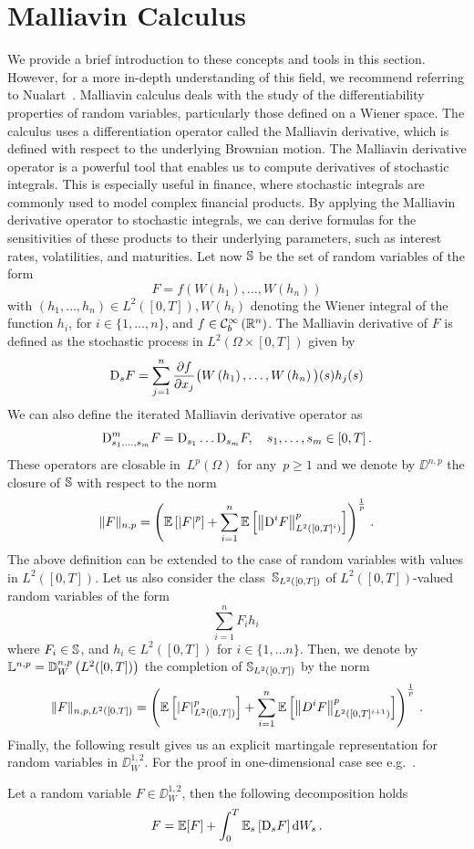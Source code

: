 \section{Malliavin Calculus}\label{apx:malliavin_calculus}

We provide a brief introduction to these concepts and tools in this section. However, for a more in-depth understanding of this field, we recommend referring to Nualart~\cite{Nualart2006TheTopics}. Malliavin calculus deals with the study of the differentiability properties of random variables, particularly those defined on a Wiener space. The calculus uses a differentiation operator called the Malliavin derivative, which is defined with respect to the underlying Brownian motion. The Malliavin derivative operator is a powerful tool that enables us to compute derivatives of stochastic integrals. This is especially useful in finance, where stochastic integrals are commonly used to model complex financial products. By applying the Malliavin derivative operator to stochastic integrals, we can derive formulas for the sensitivities of these products to their underlying parameters, such as interest rates, volatilities, and maturities. Let now $\mathbb{S}$ be the set of random variables of the form
\[
F=f\left(W\left(h_1\right), \ldots, W\left(h_n\right)\right)
\]
with $(h_1, \ldots, h_n) \in L^2([0, T]), W\left(h_i\right)$ denoting the Wiener integral of the function $h_i$, for $i\in\{1, \dots, n\}$, and $f \in \mathcal{C}_b^{\infty}\left(\mathbb{R}^n\right)$. The Malliavin derivative of $F$ is defined as the stochastic process in $L^2(\Omega \times[0, T])$ given by
\[
\mathrm{D}_s F=\sum_{j=1}^n \frac{\partial f}{\partial x_j}\big(W\left(h_1\right), \ldots, W\left(h_n\right)\big)(s) h_j(s)
\]
We can also define the iterated Malliavin derivative operator as
\[
\mathrm{D}_{s_1, \dots, s_m}^m F = \mathrm{D}_{s_1} \dots \mathrm{D}_{s_m} F, \quad s_1, \dots, s_m \in[0, T]\,.
\]
These operators are closable in~$L^p(\Omega)$ for any~$p \geq 1$ and we denote by $\DD^{n, p}$ the closure of $\mathbb{S}$ with respect to the norm
\[
\|F\|_{n, p}=\left(\mathbb{E}\left[|F|^p\right]+\sum_{i=1}^n \mathbb{E}\left[\left\|\mathrm{D}^i F\right\|_{L^2\left([0, T]^i\right)}^p\right]\right)^{\frac{1}{p}}\,.
\]
The above definition can be extended to the case of random variables with values in $L^2([0, T])$. Let us also consider the class~$\mathbb{S}_{L^2([0, T])}$ of $L^2([0, T])$-valued random variables of the form
\[
\sum_{i=1}^n F_i h_i\,
\]
where $F_i \in \mathbb{S}$, and $h_i \in L^2([0, T])$ for $i\in\{1,\dots n\}$. Then, we denote by~${\mathbb{L}^{n, p}= \mathbb{D}_W^{n, p}\left(L^2([0, T])\right)}$ the completion of $\mathbb{S}_{L^2([0, T])}$ by the norm
\[
\|F\|_{n, p, L^2([0, T])}=\left(\mathbb{E}\left[|F|_{L^2([0, T])}^p\right] + \sum_{i=1}^n \mathbb{E}\left[\left\|D^i F\right\|_{L^2\left([0, T]^{i+1}\right)}^p\right]\right)^{\frac{1}{p}}\,.
\]
Finally, the following result gives us an explicit martingale representation for random variables in $\DD_W^{1,2}$. For the proof in one-dimensional case see e.g.~\cite[Proposition 1.3.14]{Nualart2006TheTopics}.
\begin{theorem}\label{thm:ClarkOcone}
Let a random variable $F \in \DD_W^{1,2}$, then the following decomposition holds 
\[
F = \mathbb{E}[F] + \int_0^T \mathbb{E}_s\left[\mathrm{D}_s F\right] \mathrm{d} W_s\,.
\]
\end{theorem}

